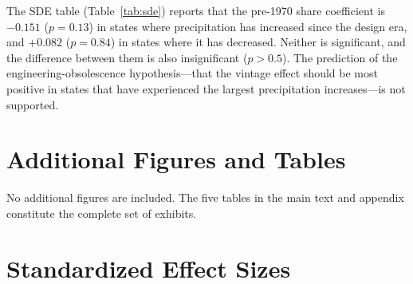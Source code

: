 \documentclass[12pt]{article}
\begin{document}
The SDE table (Table~\ref{tab:sde}) reports that the pre-1970 share coefficient is $-0.151$ ($p = 0.13$) in states where precipitation has increased since the design era, and $+0.082$ ($p = 0.84$) in states where it has decreased. Neither is significant, and the difference between them is also insignificant ($p > 0.5$). The prediction of the engineering-obsolescence hypothesis---that the vintage effect should be most positive in states that have experienced the largest precipitation increases---is not supported.

\section{Additional Figures and Tables}

No additional figures are included. The five tables in the main text and appendix constitute the complete set of exhibits.

\section{Standardized Effect Sizes}
\label{sec:sde}


\end{document}
